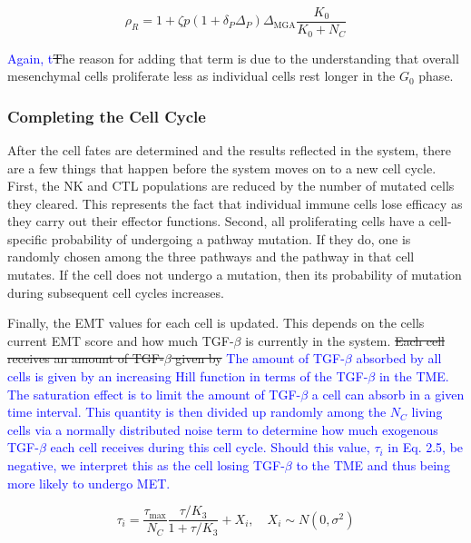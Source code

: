 \documentclass[11pt]{article}
\newcommand{\tcb} { \textcolor{blue} }
\begin{document}
\begin{equation}\tag{2.4}
\rho_R = 1 + \zeta p(1+\delta_P\Delta_P)\Delta_{\text{MGA}}\frac{K_0}{K_0+N_C}
\end{equation}

\tcb{Again, t}\sout{T}he reason for adding that term is due to the understanding that overall mesenchymal cells proliferate less as individual cells rest longer in the $G_0$ phase.

\subsubsection{Completing the Cell Cycle}
After the cell fates are determined and the results reflected in the system, there are a few things that happen before the system moves on to a new cell cycle.
First, the NK and CTL populations are reduced by the number of mutated cells they cleared.
This represents the fact that individual immune cells lose efficacy as they carry out their effector functions. 
Second, all proliferating cells have a cell-specific probability of undergoing a pathway mutation.
If they do, one is randomly chosen among the three pathways and the pathway in that cell mutates.
If the cell does not undergo a mutation, then its probability of mutation during subsequent cell cycles increases.
\par
Finally, the EMT values for each cell is updated.
This depends on the cells current EMT score and how much TGF-$\beta$ is currently in the system.
\sout{Each cell receives an amount of TGF-$\beta$ given by}
\tcb{The amount of TGF-$\beta$ absorbed by all cells is given by an increasing Hill function in terms of the TGF-$\beta$ in the TME.
The saturation effect is to limit the amount of TGF-$\beta$ a cell can absorb in a given time interval.
This quantity is then divided up randomly among the $N_C$ living cells via a normally distributed noise term to determine how much exogenous TGF-$\beta$ each cell receives during this cell cycle.
Should this value, $\tau_i$ in Eq. 2.5, be negative, we interpret this as the cell losing TGF-$\beta$ to the TME and thus being more likely to undergo MET.}

\begin{equation}\tag{2.5}
\tau_i = \frac{\tau_{\text{max}}}{N_C}\frac{\tau/K_3}{1+\tau/K_3} + X_i
, \quad X_i \sim N(0,\sigma^2)
\end{equation}
\end{document}
